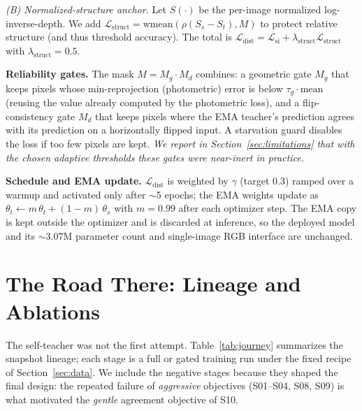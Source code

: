 \documentclass[conference]{IEEEtran}
\begin{document}
\emph{(B) Normalized-structure anchor.} Let $S(\cdot)$ be the per-image
normalized log-inverse-depth. We add
$\mathcal{L}_{\text{struct}}=\text{wmean}\!\left(\rho(S_s-S_t),M\right)$ to
protect relative structure (and thus threshold accuracy). The total is
$\mathcal{L}_{\text{dist}}=\mathcal{L}_{\text{si}}+\lambda_{\text{struct}}\mathcal{L}_{\text{struct}}$
with $\lambda_{\text{struct}}=0.5$.

\textbf{Reliability gates.} The mask $M=M_g\cdot M_d$ combines: a geometric gate
$M_g$ that keeps pixels whose min-reprojection (photometric) error is below
$\tau_g\cdot\text{mean}$ (reusing the value already computed by the photometric
loss), and a flip-consistency gate $M_d$ that keeps pixels where the EMA
teacher's prediction agrees with its prediction on a horizontally flipped input.
A starvation guard disables the loss if too few pixels are kept. \emph{We report
in Section~\ref{sec:limitations} that with the chosen adaptive thresholds these
gates were near-inert in practice.}

\textbf{Schedule and EMA update.} $\mathcal{L}_{\text{dist}}$ is weighted by
$\gamma$ (target 0.3) ramped over a warmup and activated only after $\sim$5
epochs; the EMA weights update as
$\theta_t\leftarrow m\,\theta_t+(1-m)\,\theta_s$ with $m=0.99$ after each
optimizer step. The EMA copy is kept outside the optimizer and is discarded at
inference, so the deployed model and its $\sim$3.07M parameter count and
single-image RGB interface are unchanged.

\section{The Road There: Lineage and Ablations}
\label{sec:journey}
The self-teacher was not the first attempt. Table~\ref{tab:journey} summarizes
the snapshot lineage; each stage is a full or gated training run under the fixed
recipe of Section~\ref{sec:data}. We include the negative stages because they
shaped the final design: the repeated failure of \emph{aggressive} objectives
(S01--S04, S08, S09) is what motivated the \emph{gentle} agreement objective of
S10.
\end{document}
